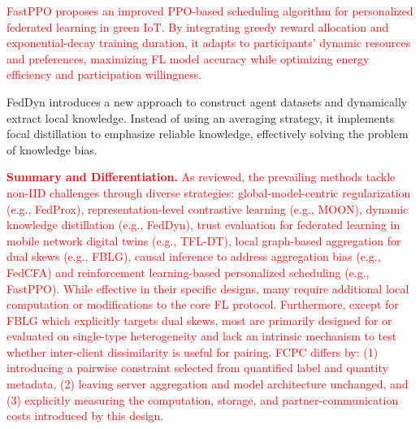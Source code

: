 \documentclass[journal,twoside,web]{ieeecolor}
\newcommand{\rev}[1]{\textcolor{red}{#1}}
\begin{document}
\rev{FastPPO\cite{fastppo} proposes an improved PPO-based scheduling algorithm for personalized federated learning in green IoT. By integrating greedy reward allocation and exponential-decay training duration, it adapts to participants’ dynamic resources and preferences, maximizing FL model accuracy while optimizing energy efficiency and participation willingness.}

FedDyn\cite{feddyn} introduces a new approach to construct agent datasets and dynamically extract local knowledge. Instead of using an averaging strategy, it implements focal distillation to emphasize reliable knowledge, effectively solving the problem of knowledge bias.






\rev{\textbf{Summary and Differentiation. }As reviewed, the prevailing methods tackle non-IID challenges through diverse strategies: global-model-centric regularization (e.g., FedProx), representation-level contrastive learning (e.g., MOON), dynamic knowledge distillation (e.g., FedDyn), trust evaluation for federated learning in mobile network digital twins (e.g., TFL-DT\cite{tfl-dt}), local graph-based aggregation for dual skews (e.g., FBLG\cite{fblg}), causal inference to address aggregation bias (e.g., FedCFA\cite{fedcfa}) and reinforcement learning-based personalized scheduling (e.g., FastPPO). While effective in their specific designs, many require additional local computation or modifications to the core FL protocol. Furthermore, except for FBLG which explicitly targets dual skews, most are primarily designed for or evaluated on single-type heterogeneity and lack an intrinsic mechanism to test whether inter-client dissimilarity is useful for pairing. FCPC differs by: (1) introducing a pairwise constraint selected from quantified label and quantity metadata, (2) leaving server aggregation and model architecture unchanged, and (3) explicitly measuring the computation, storage, and partner-communication costs introduced by this design.}
\end{document}
